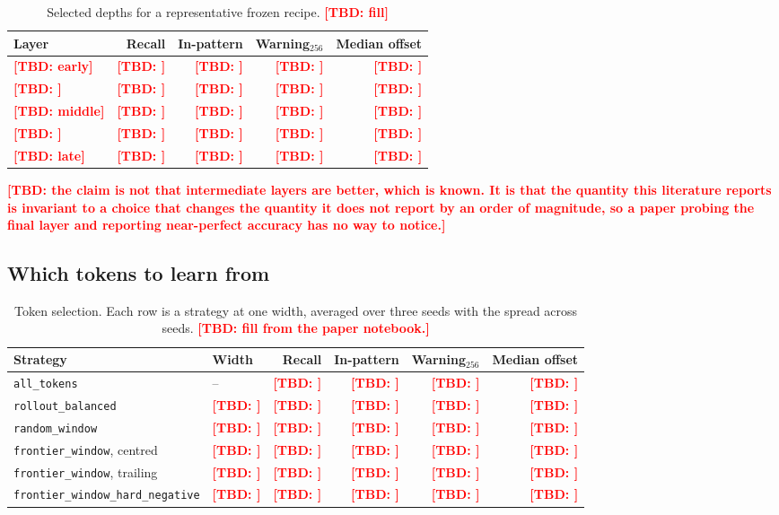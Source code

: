 \documentclass{article}
\newcommand{\TBD}[1]{\textcolor{red}{\textbf{[TBD: #1]}}}
\begin{document}
\begin{table}[t]
  \caption{Selected depths for a representative frozen recipe. \TBD{fill}}
  \label{tab:depth}
  \centering
  \small
  \begin{tabular}{lrrrr}
    \toprule
    Layer & Recall & In-pattern & Warning$_{256}$ & Median offset \\
    \midrule
    \TBD{early}  & \TBD{} & \TBD{} & \TBD{} & \TBD{} \\
    \TBD{}       & \TBD{} & \TBD{} & \TBD{} & \TBD{} \\
    \TBD{middle} & \TBD{} & \TBD{} & \TBD{} & \TBD{} \\
    \TBD{}       & \TBD{} & \TBD{} & \TBD{} & \TBD{} \\
    \TBD{late}   & \TBD{} & \TBD{} & \TBD{} & \TBD{} \\
    \bottomrule
  \end{tabular}
\end{table}

\TBD{the claim is not that intermediate layers are better, which is known. It is
that the quantity this literature reports is invariant to a choice that changes
the quantity it does not report by an order of magnitude, so a paper probing the
final layer and reporting near-perfect accuracy has no way to notice.}

\subsection{Which tokens to learn from}
\label{sec:exp-selection}

\begin{table}[t]
  \caption{Token selection. Each row is a strategy at one width, averaged over
  three seeds with the spread across seeds. \TBD{fill from the paper notebook.}}
  \label{tab:selection}
  \centering
  \small
  \begin{tabular}{llrrrr}
    \toprule
    Strategy & Width & Recall & In-pattern & Warning$_{256}$ & Median offset \\
    \midrule
    \texttt{all\_tokens}                    & --      & \TBD{} & \TBD{} & \TBD{} & \TBD{} \\
    \texttt{rollout\_balanced}              & \TBD{}  & \TBD{} & \TBD{} & \TBD{} & \TBD{} \\
    \texttt{random\_window}                 & \TBD{}  & \TBD{} & \TBD{} & \TBD{} & \TBD{} \\
    \texttt{frontier\_window}, centred      & \TBD{}  & \TBD{} & \TBD{} & \TBD{} & \TBD{} \\
    \texttt{frontier\_window}, trailing     & \TBD{}  & \TBD{} & \TBD{} & \TBD{} & \TBD{} \\
    \texttt{frontier\_window\_hard\_negative} & \TBD{} & \TBD{} & \TBD{} & \TBD{} & \TBD{} \\
    \bottomrule
  \end{tabular}
\end{table}
\end{document}
